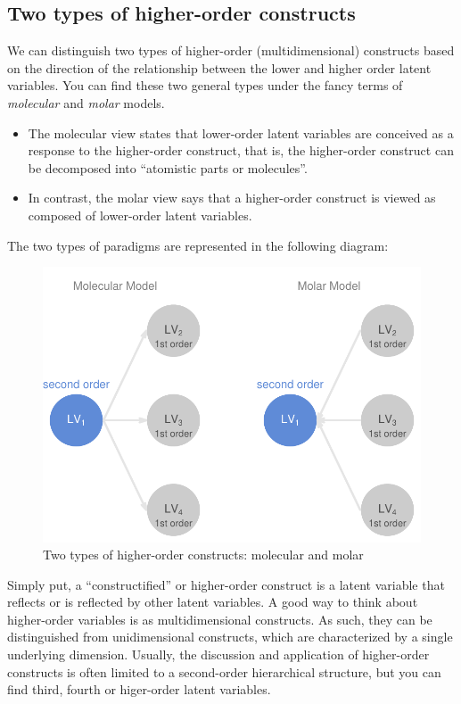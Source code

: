 \documentclass[12pt]{book}\usepackage{graphicx, color}
\newenvironment{knitrout}{}{} %
\begin{document}
\subsection{Two types of higher-order constructs}
We can distinguish two types of higher-order (multidimensional) constructs based on the direction of the relationship between the lower and higher order latent variables. You can find these two general types under the fancy terms of \textit{molecular} and \textit{molar} models.  
\begin{itemize}
 \item The molecular view states that lower-order latent variables are conceived as a response to the higher-order construct, that is, the higher-order construct can be decomposed into ``atomistic parts or molecules''. 
 \item In contrast, the molar view says that a higher-order construct is viewed as composed of lower-order latent variables.
\end{itemize}
The two types of paradigms are represented in the following diagram:



\begin{knitrout}
\color{fgcolor}\begin{figure}[h]


{\centering \includegraphics[width=0.85\linewidth,height=.45\linewidth]{figure/molecular_molar_diag} 

}

\caption[Two types of higher-order constructs]{Two types of higher-order constructs: molecular and molar\label{fig:molecular_molar_diag}}
\end{figure}


\end{knitrout}


Simply put, a ``constructified'' or higher-order construct is a latent variable that reflects or is reflected by other latent variables. A good way to think about higher-order variables is as multidimensional constructs. As such, they can be distinguished from unidimensional constructs, which are characterized by a single underlying dimension. Usually, the discussion and application of higher-order constructs is often limited to a second-order hierarchical structure, but you can find third, fourth or higer-order latent variables.
\end{document}

